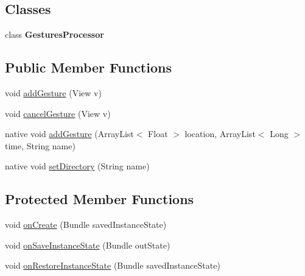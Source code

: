 \subsection*{\-Classes}
\begin{DoxyCompactItemize}
\item 
class {\bfseries \-Gestures\-Processor}
\end{DoxyCompactItemize}
\subsection*{\-Public \-Member \-Functions}
\begin{DoxyCompactItemize}
\item 
void \hyperlink{classcom_1_1openvision_1_1androidgesture_1_1_create_gesture_activity_ace3259b9154231c56e426e7656cf72b1}{add\-Gesture} (\-View v)
\item 
void \hyperlink{classcom_1_1openvision_1_1androidgesture_1_1_create_gesture_activity_a13fa4290af05a5f24ef199ba3f3a09f5}{cancel\-Gesture} (\-View v)
\item 
native void \hyperlink{classcom_1_1openvision_1_1androidgesture_1_1_create_gesture_activity_a90e2124a75b62cafab20d7ab63e9aea0}{add\-Gesture} (\-Array\-List$<$ \-Float $>$ location, \-Array\-List$<$ \-Long $>$ time, \-String name)
\item 
native void \hyperlink{classcom_1_1openvision_1_1androidgesture_1_1_create_gesture_activity_a8c50fec91db3e2b2f4cc066a8fad1dcf}{set\-Directory} (\-String name)
\end{DoxyCompactItemize}
\subsection*{\-Protected \-Member \-Functions}
\begin{DoxyCompactItemize}
\item 
void \hyperlink{classcom_1_1openvision_1_1androidgesture_1_1_create_gesture_activity_a4e81a9e8913ce9db0ca81aa8aab43a62}{on\-Create} (\-Bundle saved\-Instance\-State)
\item 
void \hyperlink{classcom_1_1openvision_1_1androidgesture_1_1_create_gesture_activity_a0b5e3f5d97404c75edc228910d093af5}{on\-Save\-Instance\-State} (\-Bundle out\-State)
\item 
void \hyperlink{classcom_1_1openvision_1_1androidgesture_1_1_create_gesture_activity_ac77cfb3c65018452e2e8951b6311492c}{on\-Restore\-Instance\-State} (\-Bundle saved\-Instance\-State)
\end{DoxyCompactItemize}
